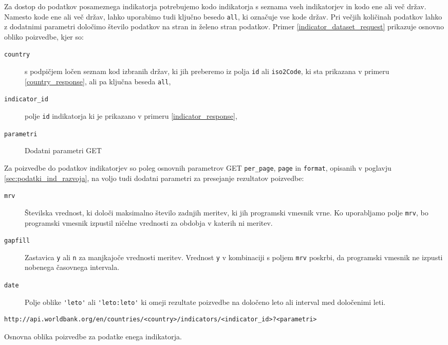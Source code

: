 Za dostop do podatkov posameznega indikatorja potrebujemo kodo
indikatorja s seznama vseh indikatorjev in kodo ene ali več držav. Namesto
kode ene ali več držav, lahko uporabimo tudi ključno besedo {\tt all}, ki
označuje vse kode držav. Pri večjih količinah podatkov lahko z dodatnimi
parametri določimo število podatkov na stran in želeno stran podatkov.
Primer \ref{indicator_dataset_request} prikazuje osnovno obliko poizvedbe,
kjer so:
\begin{description}
  \item [\tt country] s podpičjem ločen seznam kod izbranih držav, ki jih 
    preberemo iz polja {\tt id} ali {\tt iso2Code}, ki sta prikazana v primeru 
    \ref{country_response}, ali pa ključna beseda {\tt all},
  \item [\tt indicator\_id] polje {\tt id} indikatorja ki je prikazano v primeru 
    \ref{indicator_response},
\item [\tt parametri] Dodatni parametri GET 
\end{description}
Za poizvedbe do podatkov indikatorjev so poleg osnovnih parametrov GET 
\verb|per_page|, \verb|page| in \verb|format|, opisanih v poglavju 
\ref{sec:podatki_ind_razvoja}, na voljo tudi dodatni parametri za presejanje
rezultatov poizvedbe:
\begin{description}  
\item [\tt mrv] Številska vrednost, ki določi maksimalno število zadnjih meritev,
    ki jih programski vmesnik vrne. Ko uporabljamo polje \verb|mrv|, bo 
    programski vmesnik izpustil ničelne vrednosti za obdobja v katerih ni
    meritev.
\item [\tt gapfill] Zastavica \verb|y| ali \verb|n| za manjkajoče vrednosti meritev.
    Vrednost \verb|y| v kombinaciji s poljem \verb|mrv| poskrbi, da programski 
    vmesnik ne izpusti nobenega časovnega intervala.
\item [\tt date] Polje oblike \verb|'leto'| ali \verb|'leto:leto'| ki omeji rezultate poizvedbe
    na določeno leto ali interval med določenimi leti. 
\end{description}


\begin{snippet}
\begin{center}
\begin{lstlisting}
http://api.worldbank.org/en/countries/<country>/indicators/<indicator_id>?<parametri>
\end{lstlisting}
\end{center}
\caption{Osnovna oblika poizvedbe za podatke enega indikatorja.}
\label{indicator_dataset_request}
\end{snippet} 

